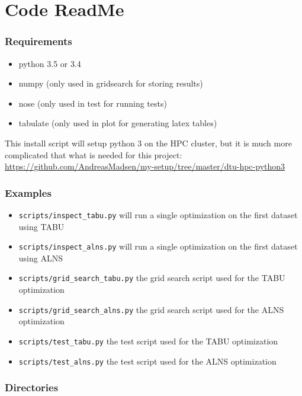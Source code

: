 \section{Code ReadMe}

\subsubsection*{Requirements}

\begin{itemize}
\item python 3.5 or 3.4
\item numpy (only used in gridsearch for storing results)
\item nose (only used in test for running tests)
\item tabulate (only used in plot for generating latex tables)
\end{itemize}

This install script will setup python 3 on the HPC cluster, but it is much
more complicated that what is needed for this project:
\url{https://github.com/AndreasMadsen/my-setup/tree/master/dtu-hpc-python3}

\subsubsection*{Examples}

\begin{itemize}
\item \texttt{scripts/inspect\_tabu.py} will run a single optimization on the first dataset using TABU
\item \texttt{scripts/inspect\_alns.py} will run a single optimization on the first dataset using ALNS
\item \texttt{scripts/grid\_search\_tabu.py} the grid search script used for the TABU optimization
\item \texttt{scripts/grid\_search\_alns.py} the grid search script used for the ALNS optimization
\item \texttt{scripts/test\_tabu.py} the test script used for the TABU optimization
\item \texttt{scripts/test\_alns.py} the test script used for the ALNS optimization
\end{itemize}

\subsubsection*{Directories}


